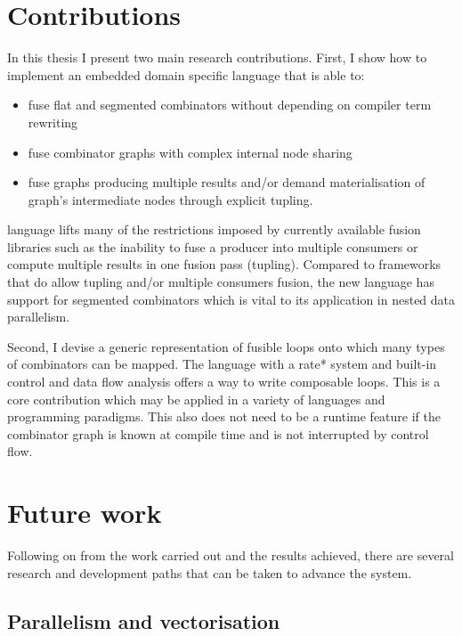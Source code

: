 \documentclass[preamble.tex]{subfiles}
\begin{document}
\section{Contributions}

In this thesis I present two main research contributions. First, I show how to implement an embedded domain specific language that is able to:
\begin{itemize}
  \item fuse flat and segmented combinators without depending on compiler term rewriting

  \item fuse combinator graphs with complex internal node sharing

  \item fuse graphs producing multiple results and/or demand materialisation of graph's intermediate nodes through explicit tupling.
\end{itemize}

\LiveFusion language lifts many of the restrictions imposed by currently available fusion libraries such as the inability to fuse a producer into multiple consumers or compute multiple results in one fusion pass (tupling). Compared to frameworks that do allow tupling and/or multiple consumers fusion, the new language has support for segmented combinators which is vital to its application in nested data parallelism.

Second, I devise a generic representation of fusible loops onto which many types of combinators can be mapped. The \Loop language with a \*rate* system and built-in control and data flow analysis offers a way to write composable loops. This is a core contribution which may be applied in a variety of languages and programming paradigms. This also does not need to be a runtime feature if the combinator graph is known at compile time and is not interrupted by control flow.



\section{Future work}

Following on from the work carried out and the results achieved, there are several research and development paths that can be taken to advance the \LiveFusion system.

\subsection{Parallelism and vectorisation}
\end{document}
